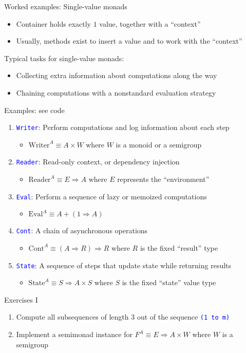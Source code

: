 \documentclass[english]{beamer}
\begin{document}
\begin{frame}{Worked examples: Single-value monads}

\begin{itemize}
\item Container holds exactly $1$ value, together with a ``context''
\item Usually, methods exist to insert a value and to work with the ``context''
\end{itemize}
Typical tasks for single-value monads:
\begin{itemize}
\item Collecting extra information about computations along the way
\item Chaining computations with a nonstandard evaluation strategy
\end{itemize}
Examples: see code
\begin{enumerate}
\item \texttt{\textcolor{blue}{\footnotesize{}Writer}}: Perform computations
and log information about each step
\begin{itemize}
\item $\text{Writer}^{A}\equiv A\times W$ where $W$ is a monoid or a semigroup
\end{itemize}
\item \texttt{\textcolor{blue}{\footnotesize{}Reader}}: Read-only context,
or dependency injection
\begin{itemize}
\item $\text{Reader}^{A}\equiv E\Rightarrow A$ where $E$ represents the
``environment''
\end{itemize}
\item \texttt{\textcolor{blue}{\footnotesize{}Eval}}: Perform a sequence
of lazy or memoized computations
\begin{itemize}
\item $\text{Eval}^{A}\equiv A+\left(1\Rightarrow A\right)$
\end{itemize}
\item \texttt{\textcolor{blue}{\footnotesize{}Cont}}: A chain of asynchronous
operations
\begin{itemize}
\item $\text{Cont}^{A}\equiv\left(A\Rightarrow R\right)\Rightarrow R$ where
$R$ is the fixed ``result'' type
\end{itemize}
\item \texttt{\textcolor{blue}{\footnotesize{}State}}: A sequence of steps
that update state while returning results
\begin{itemize}
\item $\text{State}^{A}\equiv S\Rightarrow A\times S$ where $S$ is the
fixed ``state'' value type
\end{itemize}
\end{enumerate}
\end{frame}

\begin{frame}{Exercises I}
\begin{enumerate}
\item Compute all subsequences of length 3 out of the sequence \texttt{\textcolor{blue}{\footnotesize{}(1
to m)}} 
\item Implement a semimonad instance for $F^{A}\equiv E\Rightarrow A\times W$
where $W$ is a semigroup
\end{enumerate}
\end{frame}
\end{document}
